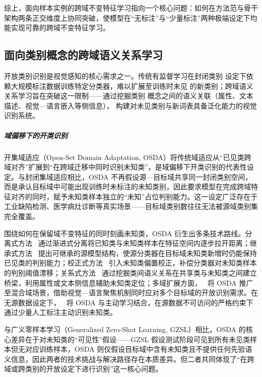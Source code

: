 综上，面向样本实例的跨域不变特征学习指向一个核心问题：如何在方法范与骨干架构两条正交维度上协同突破，使模型在“无标注”与“少量标注”两种极端设定下均能实现可靠的跨域不变特征学习。

\subsection{面向类别概念的跨域语义关系学习}

开放类别识别是视觉感知的核心需求之一。传统有监督学习在封闭类别 设定下依赖大规模标注数据训练特定分类器，难以扩展至训练时未见 的新类别；跨域语义关系学习旨在突破这一限制——通过挖掘类别 概念之间的语义关联（属性、文本描述、视觉—语言嵌入等侧信息）， 构建对未见类别与新词表具备泛化能力的视觉识别系统。


\subparagraph{域偏移下的开类识别}

开集域适应（Open-Set Domain Adaptation, OSDA）将传统域适应从“已见类跨域对齐”扩展到“在跨域迁移中同时识别未知类”，是域偏移下开类识别的代表性设定。与封闭集域适应相比，OSDA 不再假设源—目标域共享同一封闭类别空间，而是承认目标域中可能出现训练时未标注的未知类别，因此要求模型在完成跨域特征对齐的同时，赋予未知类样本独立的“未知”占位判别能力。这一设定广泛存在于工业缺陷检测、医学病灶诊断等真实场景——目标域类别数往往无法被源域类别集完全覆盖。

围绕如何在保留域不变特征的同时刻画未知类，OSDA 衍生出多条技术路线。分离式方法~\cite{liu2021separate} 通过渐进式分离将已知类与未知类样本在特征空间内逐步拉开距离；继承式方法~\cite{kundu2022towards} 提出可继承的源模型结构，使源分类器在目标域未知类新增时仍能保持已见类的判别能力；校正式方法~\cite{li2023adjustment} 引入未知类偏置校正，补偿分类器对未知类样本的判别阈值漂移；关系式方法~\cite{tong2025reserve} 通过挖掘类间语义关系在共享类与未知类之间建立桥梁，利用属性或文本侧信息辅助未知类定位；多域扩展方面，~\cite{liu2025open} 将 OSDA 推广至混合域场景，借助视觉—语言聚焦机制同时应对多个目标域的开放识别需求。在无源数据设定下，~\cite{wang2025active} 将 OSDA 与主动学习结合，在源数据不可访问的严格约束下通过少量人工标注主动识别未知类。

与广义零样本学习（Generalized Zero-Shot Learning, GZSL）相比，OSDA 的核心差异在于对未知类的“可见性”假设——GZSL 假设测试阶段可见到所有未见类样本但无对应训练样本，OSDA 则仅假设目标域中含有未知类且不提供任何先验语义信息，因此两者的技术挑战与解决路径存在本质差异。但二者共同体现了“在跨域或跨类别的开放设定下进行识别”这一核心问题。

